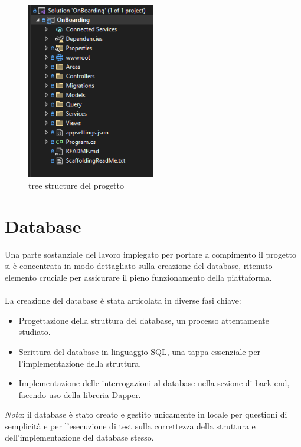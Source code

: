 %
\begin{figure}[H]
	\centering
	\includegraphics[width=0.5\textwidth]{img/treeStructure.png}
	\caption{tree structure del progetto}
	\label{fig:treeStructure}
\end{figure}
%
\section{Database}\label{sec:cap_sec_subsec}
Una parte sostanziale del lavoro impiegato per portare a compimento il
progetto si è concentrata in modo dettagliato sulla creazione del database,
ritenuto elemento cruciale per assicurare il pieno funzionamento della
piattaforma. 
\\ \\ 
La creazione del database è stata articolata in diverse fasi chiave:
\begin{itemize}
	\item Progettazione della struttura del database, un processo attentamente studiato.
	\item Scrittura del database in linguaggio SQL, una tappa essenziale per l'implementazione della struttura.
	\item Implementazione delle interrogazioni al database nella sezione di back-end,
	      facendo uso della libreria Dapper.
\end{itemize}
\textit{Nota}: il database è stato creato e gestito unicamente in locale per questioni di semplicità e per
l'esecuzione di test sulla correttezza della struttura e dell'implementazione del database stesso.
%
